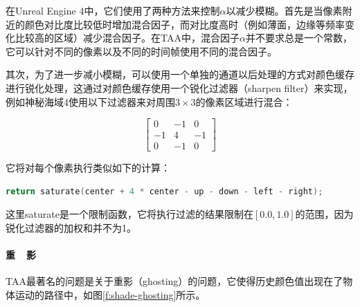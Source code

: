 在Unreal Engine 4中，它们使用了两种方法来控制$\alpha$以减少模糊。首先是当像素附近的颜色对比度比较低时增加混合因子，而对比度高时（例如薄面，边缘等频率变化比较高的区域）减少混合因子。在TAA中，混合因子$\alpha$并不要求总是一个常数，它可以针对不同的像素以及不同的时间帧使用不同的混合因子。

其次，为了进一步减小模糊，可以使用一个单独的通道以后处理的方式对颜色缓存进行锐化处理，这通过对颜色缓存使用一个锐化过滤器（sharpen filter）来实现，例如神秘海域4使用以下过滤器来对周围$3\times 3$的像素区域进行混合：

\begin{equation}
\begin{bmatrix}
	0  & -1 & 0\\
	-1 & 4  & -1\\
	0  & -1 & 0
\end{bmatrix}
\end{equation}

它将对每个像素执行类似如下的计算：

\begin{lstlisting}[language=C++]
return saturate(center + 4 * center - up - down - left - right);
\end{lstlisting}

这里saturate是一个限制函数，它将执行过滤的结果限制在$[0.0,1.0]$的范围，因为锐化过滤器的加权和并不为1。





\paragraph{重~~影}
TAA最著名的问题是关于重影（ghosting）的问题，它使得历史颜色值出现在了物体运动的路径中，如图\ref{f:shade-ghosting}所示。

